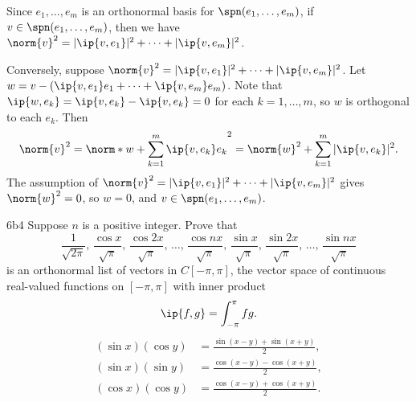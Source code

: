 \begin{sol}
    Since $e_1, \ldots, e_m$ is an orthonormal basis for $\spn(e_1, \ldots, e_m)$, if $v \in \spn(e_1, \ldots, e_m)$, then we have $\norm{v}^2 = |\ip{v, e_1}|^2 + \cdots + |\ip{v, e_m}|^2$.

    Conversely, suppose $\norm{v}^2 = |\ip{v, e_1}|^2 + \cdots + |\ip{v, e_m}|^2$.
    Let $w = v - (\ip{v, e_1}e_1 + \cdots + \ip{v, e_m}e_m)$.
    Note that $\ip{w, e_k} = \ip{v, e_k} - \ip{v, e_k} = 0$ for each $k = 1, \ldots, m$, so $w$ is orthogonal to each $e_k$.
    Then
    \[
        \norm{v}^2 = \norm*{w + \sum_{k=1}^m \ip{v, e_k}e_k}^2 = \norm{w}^2 + \sum_{k=1}^m |\ip{v, e_k}|^2.
    \]
    The assumption of $\norm{v}^2 = |\ip{v, e_1}|^2 + \cdots + |\ip{v, e_m}|^2$ gives $\norm{w}^2 = 0$, so $w = 0$, and $v \in \spn(e_1, \ldots, e_m)$.
\end{sol}

\begin{exercise}{6b4}
    Suppose $n$ is a positive integer.
    Prove that
    \[
        \frac{1}{\sqrt{2\pi}},\, \frac{\cos x}{\sqrt{\pi}},\, \frac{\cos 2x}{\sqrt{\pi}},\, \ldots,\, \frac{\cos nx}{\sqrt{\pi}},\, \frac{\sin x}{\sqrt{\pi}},\, \frac{\sin 2x}{\sqrt{\pi}},\, \ldots,\, \frac{\sin nx}{\sqrt{\pi}}
    \]
    is an orthonormal list of vectors in $C[-\pi, \pi]$, the vector space of continuous real-valued functions on $[-\pi, \pi]$ with inner product
    \[
        \ip{f, g} = \int_{-\pi}^{\pi} fg.
    \]
    \begin{align*}
        (\sin x)(\cos y) &= \frac{\sin(x - y) + \sin(x + y)}{2}, \\
        (\sin x)(\sin y) &= \frac{\cos(x - y) - \cos(x + y)}{2}, \\
        (\cos x)(\cos y) &= \frac{\cos(x - y) + \cos(x + y)}{2}.
    \end{align*}
\end{exercise}

